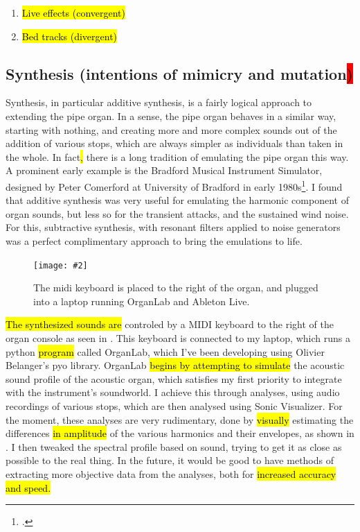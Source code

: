 \documentclass[12pt,twoside,maitrise]{dms_ks}
\newcommand{\customincludegraphics}[4][]{%
    \begin{figure}[H]
        \centering
        \texttt{[image: \#2]}
        \caption{#4}
	\label{#3} 
    \end{figure}
}
\theoremstyle{definition}
\begin{document}
{\begin{enumerate}
  \item \hl{Live effects (convergent)}
  
  \item \hl{Bed tracks (divergent)}
\end{enumerate}

\subsection{Synthesis (intentions of mimicry and mutation\colorbox{red}{)}}

Synthesis, in particular additive synthesis, is a fairly logical approach to extending the pipe organ. 
In a sense, the pipe organ behaves in a similar way, starting with nothing, and creating more and more complex sounds out of the addition of various stops, which are always simpler as individuals than taken in the whole. 
In fact\hl{,} there is a long tradition of emulating the pipe organ this way. 
A prominent early example is the Bradford Musical Instrument Simulator, designed by Peter Comerford at University of Bradford in early 1980s\footcite[61]{comerford_simulating_1993}. 
I found that additive synthesis was very useful for emulating the harmonic component of organ sounds, but less so for the transient attacks, and the sustained wind noise. 
For this, subtractive synthesis, with resonant filters applied to noise generators was a perfect complimentary approach to bring the emulations to life.

\customincludegraphics[scale=0.065]{IMG_3414_copy.jpg}{fig:interface}{The midi keyboard is placed to the right of the organ, and plugged into a laptop running OrganLab and Ableton Live.}

\hl{The synthesized sounds are} controled by a MIDI keyboard to the right of the organ console as seen in . 
This keyboard is connected to my laptop, which runs a python \hl{program} called OrganLab, which I've been developing using Olivier Belanger's pyo library. 
OrganLab \hl{begins by attempting to simulate} the acoustic sound profile of the acoustic organ, which satisfies my first priority to integrate with the instrument's soundworld. 
I achieve this through analyses, using audio recordings of various stops, which are then analysed using Sonic Visualizer. 
For the moment, these analyses are very rudimentary, done  by \hl{visually} estimating the differences \hl{in amplitude }of the various harmonics and their envelopes, as shown in . 
I then tweaked the spectral profile based on sound, trying to get it as close as possible to the real thing. 
In the future, it would be good to have methods of extracting more objective data from the analyses, both for \hl{increased accuracy and speed.}

}
\end{document}
